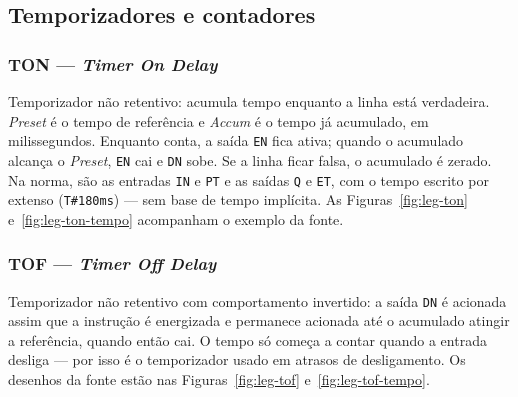 \subsection{Temporizadores e contadores}

\subsubsection{TON --- \emph{Timer On Delay}}

Temporizador não retentivo: acumula tempo enquanto a linha está verdadeira. \emph{Preset} é o tempo de
referência e \emph{Accum} é o tempo já acumulado, em milissegundos. Enquanto conta, a saída \texttt{EN}
fica ativa; quando o acumulado alcança o \emph{Preset}, \texttt{EN} cai e \texttt{DN} sobe. Se a linha
ficar falsa, o acumulado é zerado. Na norma, são as entradas \texttt{IN} e \texttt{PT} e as saídas
\texttt{Q} e \texttt{ET}, com o tempo escrito por extenso (\texttt{T\#180ms}) --- sem base de tempo
implícita.
As Figuras~\ref{fig:leg-ton} e~\ref{fig:leg-ton-tempo} acompanham o exemplo da fonte.



\subsubsection{TOF --- \emph{Timer Off Delay}}

Temporizador não retentivo com comportamento invertido: a saída \texttt{DN} é acionada assim que a
instrução é energizada e permanece acionada até o acumulado atingir a referência, quando então cai. O
tempo só começa a contar quando a entrada desliga --- por isso é o temporizador usado em atrasos de
desligamento.
Os desenhos da fonte estão nas Figuras~\ref{fig:leg-tof} e~\ref{fig:leg-tof-tempo}.



